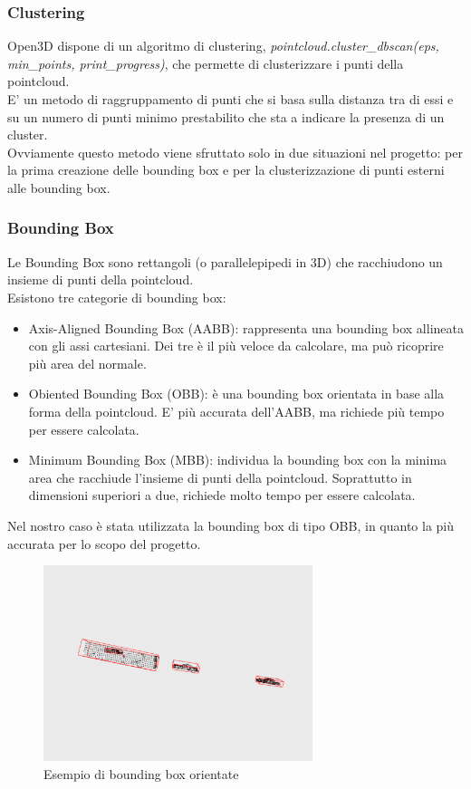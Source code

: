 \documentclass[italian]{article}
\begin{document}
\subsubsection*{Clustering}
Open3D dispone di un algoritmo di clustering, \textit{pointcloud.cluster\_dbscan(eps, min\_points, print\_progress)}, che permette di clusterizzare i punti della pointcloud.\\
E' un metodo di raggruppamento di punti che si basa sulla distanza tra di essi e su un numero di punti minimo prestabilito che sta a indicare la presenza di un cluster.\\
Ovviamente questo metodo viene sfruttato solo in due situazioni nel progetto: per la prima creazione delle bounding box e per la clusterizzazione di punti esterni alle bounding box.
\subsubsection{Bounding Box}
Le Bounding Box sono rettangoli (o parallelepipedi in 3D) che racchiudono un insieme di punti della pointcloud.\\
Esistono tre categorie di bounding box:
\begin{itemize}
	\item Axis-Aligned Bounding Box (AABB): rappresenta una bounding box allineata con gli assi cartesiani. Dei tre è il più veloce da calcolare, ma può ricoprire più area del normale.
	\item Obiented Bounding Box (OBB): è una bounding box orientata in base alla forma della pointcloud. E' più accurata dell'AABB, ma richiede più tempo per essere calcolata.
	\item Minimum Bounding Box (MBB): individua la bounding box con la minima area che racchiude l'insieme di punti della pointcloud. Soprattutto in dimensioni superiori a due, richiede molto tempo per essere calcolata.
\end{itemize}
Nel nostro caso è stata utilizzata la bounding box di tipo OBB, in quanto la più accurata per lo scopo del progetto.
\begin{figure}[H]
	\centering
	\includegraphics[width=0.7\textwidth]{bbox}
	\footnotesize
	\caption{Esempio di bounding box orientate}
\end{figure}\\
\end{document}
